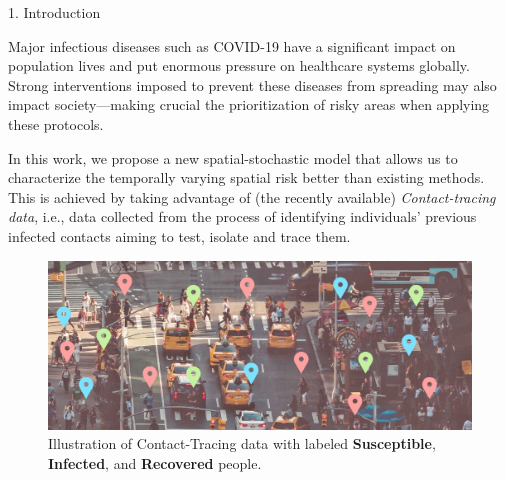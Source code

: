 \documentclass[12pt]{beamer}
\begin{document}
	\begin{frame}[t]
		\begin{columns}[t]
			\begin{column}{0.30\textwidth} \justifying %
				\begin{block}{\Large 1. Introduction} \justifying \vspace{12pt}
					
					Major infectious diseases such as COVID-19 have a significant impact on population lives and put enormous pressure on healthcare systems globally. Strong interventions imposed to prevent these diseases from spreading may also impact society---making crucial the prioritization \hspace{-3pt}of \hspace{-3pt}risky\hspace{-2pt} areas\hspace{-2pt} when\hspace{-2pt} applying \hspace{-3pt}these \hspace{-2pt}protocols.\vspace{12pt}
					
					In this work, we propose a new spatial-stochastic model that allows us to characterize the temporally varying spatial risk better than existing methods. This is achieved by taking advantage of (the recently available) \textit{Contact-tracing data}, i.e., data collected from the process of identifying individuals' previous infected contacts aiming to test, isolate and trace them.\vspace{12pt}
					
					\begin{figure}[!ht]
						\centering
						\includegraphics[width = 1\textwidth]{Images/SIR_image}
						\caption{\justifying Illustration of Contact-Tracing data with labeled\hspace{-1pt} \textcolor{my-blue}{\textbf{Susceptible}}, \textcolor{my-red}{\textbf{Infected}}, and \textcolor{my-green}{\textbf{Recovered}} people.}
						\label{fig:SIR-illustration}
					\end{figure}
				

\end{block}
\end{column}
\end{columns}
\end{frame}
\end{document}
